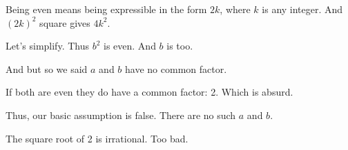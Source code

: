 \documentclass{article}
\begin{document}
\step[A] Being even means being expressible in the form $2k$, where $k$ is
any integer.
\step[B] And $(2k)^2$ square gives $4k^2$.

\step[C] Let's simplify.
\step Thus $b^2$ is even.
\step And $b$ is too.

\endslide





\step[visible=true] And but so we said $a$ and $b$ have no common factor.

\step If both are even they do have a common factor: 2.
\step Which is absurd.

\step Thus, our basic assumption is false.
\step[A] There are no such $a$ and $b$.

\step The square root of 2 is irrational.
\step Too bad.

\endslide
\end{document}
